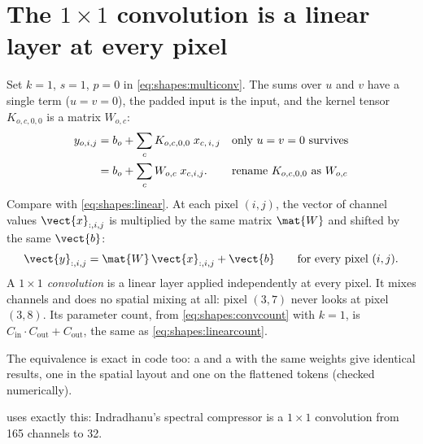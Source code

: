 \section{The $1\times1$ convolution is a linear layer at every pixel}\label{sec:shapes:onebyone}

Set $k=1$, $s=1$, $p=0$ in \cref{eq:shapes:multiconv}. The sums over $u$ and $v$ have a single term
($u=v=0$), the padded input is the input, and the kernel tensor $K_{o,c,0,0}$ is a matrix $W_{o,c}$:
\begin{align}
y_{o,i,j} &= b_o + \sum_{c} K_{o,c,0,0}\; x_{c,\,i,\,j}
  && \text{only $u=v=0$ survives}\notag\\
&= b_o + \sum_{c} W_{o,c}\; x_{c,i,j}.
  && \text{rename $K_{o,c,0,0}$ as $W_{o,c}$}\label{eq:shapes:onebyone}
\end{align}
Compare with \cref{eq:shapes:linear}. At each pixel $(i,j)$, the vector of channel values
$\vect{x}_{:,i,j}$ is multiplied by the same matrix $\mat{W}$ and shifted by the same $\vect{b}$:
\begin{equation}
\vect{y}_{:,i,j} = \mat{W}\,\vect{x}_{:,i,j} + \vect{b}\qquad\text{for every pixel } (i,j).
\end{equation}
A \emph{$1\times1$ convolution} is a linear layer applied independently at
every pixel. It mixes channels and does no spatial mixing at all: pixel $(3,7)$ never looks at
pixel $(3,8)$. Its parameter count, from \cref{eq:shapes:convcount} with $k=1$, is
$C_{\text{in}}\cdot C_{\text{out}} + C_{\text{out}}$, the same as \cref{eq:shapes:linearcount}.

The equivalence is exact in code too: a  and a  with
the same weights give identical results, one in the spatial layout and one on the flattened tokens
(checked numerically\tagC).


 uses exactly this: Indradhanu's spectral compressor is a $1\times1$ convolution
from 165 channels to 32.

